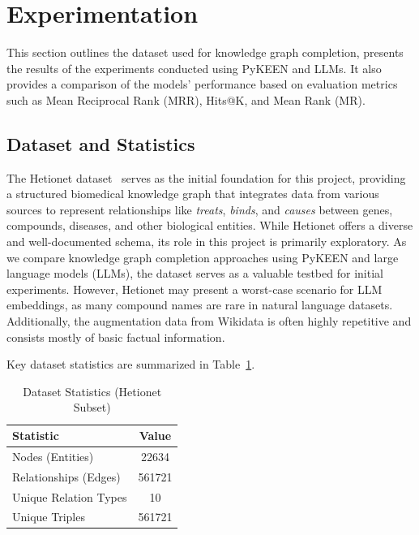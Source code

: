 \section*{Experimentation}


This section outlines the dataset used for knowledge graph completion, presents the results of the experiments conducted using PyKEEN and LLMs.
It also provides a comparison of the models' performance based on evaluation metrics such as Mean Reciprocal Rank (MRR), Hits@K, and Mean Rank (MR).

\subsection*{Dataset and Statistics}

The Hetionet dataset~\cite{hetionet} serves as the initial foundation for this project, providing a structured biomedical knowledge graph
that integrates data from various sources to represent relationships like \textit{treats}, \textit{binds}, and \textit{causes} between genes,
compounds, diseases, and other biological entities.
While Hetionet offers a diverse and well-documented schema, its role in this project is primarily exploratory.
As we compare knowledge graph completion approaches using PyKEEN and large language models (LLMs), the dataset serves as a valuable testbed for initial experiments.
However, Hetionet may present a worst-case scenario for LLM embeddings, as many compound names are rare in natural language datasets.
Additionally, the augmentation data from Wikidata is often highly repetitive and consists mostly of basic factual information.

Key dataset statistics are summarized in Table~\ref{tab:dataset_stats}.

\begin{table}[ht]
    \centering
    \caption{Dataset Statistics (Hetionet Subset)}
    \begin{tabular}{l c}
        \hline
        \textbf{Statistic}    & \textbf{Value} \\
        \hline
        Nodes (Entities)      & 22634          \\ %
        Relationships (Edges) & 561721         \\ %
        Unique Relation Types & 10             \\ %
        Unique Triples        & 561721         \\ %
        \hline
    \end{tabular}
    \label{tab:dataset_stats}
\end{table}


